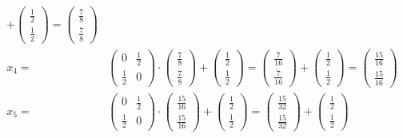 \documentclass[a4paper,10pt]{article}
\begin{document}
\begin{enumerate}[a)]
\begin{align*}
		+
		\begin{pmatrix}
		\frac{1}{2}\\[2pt]
		\frac{1}{2}
		\end{pmatrix}
		=
		\begin{pmatrix}
		\frac{7}{8}\\[2pt]
		\frac{7}{8}
		\end{pmatrix}\\
		x_4 = &
		\begin{pmatrix}
		0 & \frac{1}{2}\\[2pt]
		\frac{1}{2} & 0
		\end{pmatrix} 
		\cdot
		\begin{pmatrix}
		\frac{7}{8}\\[2pt]
		\frac{7}{8}
		\end{pmatrix}
		+
		\begin{pmatrix}
		\frac{1}{2}\\[2pt]
		\frac{1}{2}
		\end{pmatrix}
		=
		\begin{pmatrix}
		\frac{7}{16}\\[2pt]
		\frac{7}{16}
		\end{pmatrix}
		+
		\begin{pmatrix}
		\frac{1}{2}\\[2pt]
		\frac{1}{2}
		\end{pmatrix}
		=
		\begin{pmatrix}
		\frac{15}{16}\\[2pt]
		\frac{15}{16}
		\end{pmatrix}\\
		x_5 = &
		\begin{pmatrix}
		0 & \frac{1}{2}\\[2pt]
		\frac{1}{2} & 0
		\end{pmatrix} 
		\cdot
		\begin{pmatrix}
		\frac{15}{16}\\[2pt]
		\frac{15}{16}
		\end{pmatrix}
		+
		\begin{pmatrix}
		\frac{1}{2}\\[2pt]
		\frac{1}{2}
		\end{pmatrix}
		=
		\begin{pmatrix}
		\frac{15}{32}\\[2pt]
		\frac{15}{32}
		\end{pmatrix}
		+
		\begin{pmatrix}
		\frac{1}{2}\\[2pt]
		\frac{1}{2}
		\end{pmatrix}

\end{align*}
\end{enumerate}
\end{document}
